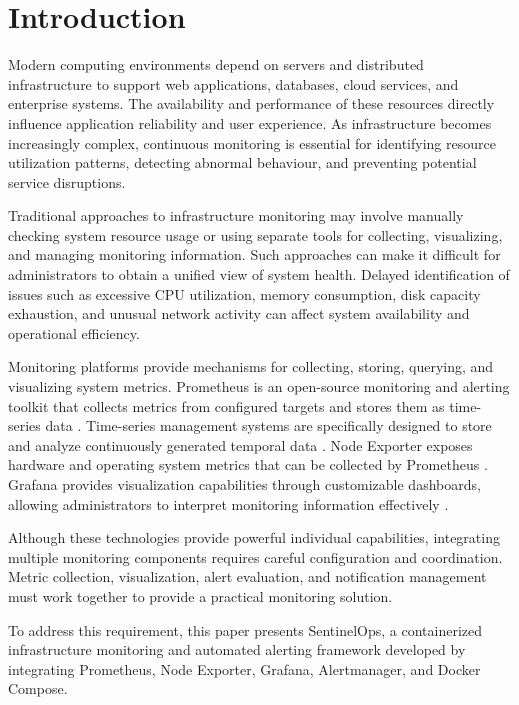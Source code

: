 \documentclass[conference]{IEEEtran}
\begin{document}

\section{Introduction}

Modern computing environments depend on servers and distributed
infrastructure to support web applications, databases, cloud
services, and enterprise systems. The availability and performance
of these resources directly influence application reliability and
user experience. As infrastructure becomes increasingly complex,
continuous monitoring is essential for identifying resource
utilization patterns, detecting abnormal behaviour, and preventing
potential service disruptions.

Traditional approaches to infrastructure monitoring may involve
manually checking system resource usage or using separate tools
for collecting, visualizing, and managing monitoring information.
Such approaches can make it difficult for administrators to obtain
a unified view of system health. Delayed identification of issues
such as excessive CPU utilization, memory consumption, disk
capacity exhaustion, and unusual network activity can affect
system availability and operational efficiency.

Monitoring platforms provide mechanisms for collecting, storing,
querying, and visualizing system metrics. Prometheus is an
open-source monitoring and alerting toolkit that collects metrics
from configured targets and stores them as time-series data
\cite{prometheus}. Time-series management systems are specifically
designed to store and analyze continuously generated temporal data
\cite{jensen2017}. Node Exporter exposes hardware and operating
system metrics that can be collected by Prometheus
\cite{nodeexporter}. Grafana provides visualization capabilities
through customizable dashboards, allowing administrators to
interpret monitoring information effectively \cite{grafana}.

Although these technologies provide powerful individual
capabilities, integrating multiple monitoring components requires
careful configuration and coordination. Metric collection,
visualization, alert evaluation, and notification management must
work together to provide a practical monitoring solution.

To address this requirement, this paper presents SentinelOps,
a containerized infrastructure monitoring and automated alerting
framework developed by integrating Prometheus, Node Exporter,
Grafana, Alertmanager, and Docker Compose.
\end{document}
